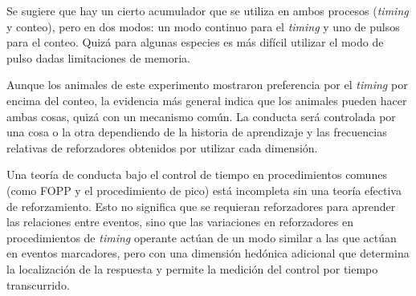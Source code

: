 \documentclass[a4paper,12pt]{article}
\begin{document}
Se sugiere que hay un cierto acumulador que se utiliza en ambos procesos ({\itshape timing} y conteo), pero en dos modos: un modo continuo para el {\itshape timing} y uno de pulsos para el conteo. Quizá para algunas especies es más difícil utilizar el modo de pulso dadas limitaciones de memoria.

Aunque los animales de este experimento mostraron preferencia por el {\itshape timing} por encima del conteo, la evidencia más general indica que los animales pueden hacer ambas cosas, quizá con un mecanismo común. La conducta será controlada por una cosa o la otra dependiendo de la historia de aprendizaje y las frecuencias relativas de reforzadores obtenidos por utilizar cada dimensión.

Una teoría de conducta bajo el control de tiempo en procedimientos comunes (como FOPP y el procedimiento de pico) está incompleta sin una teoría efectiva de reforzamiento. Esto no significa que se requieran reforzadores para aprender las relaciones entre eventos, sino que las variaciones en reforzadores en procedimientos de {\itshape timing} operante actúan de un modo similar a las que actúan en eventos marcadores, pero con una dimensión hedónica adicional que determina la localización de la respuesta y permite la medición del control por tiempo transcurrido.
\end{document}

